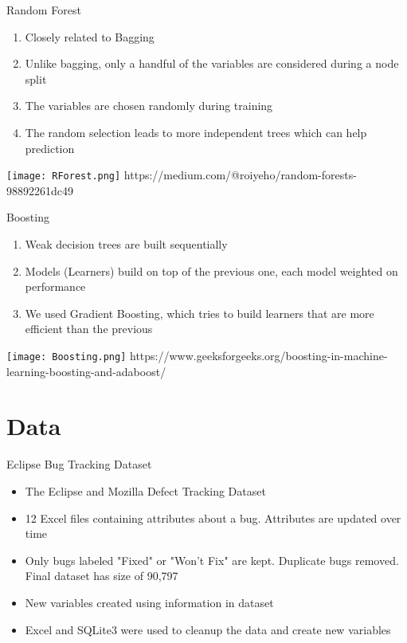 \documentclass[notes,compress,serif,professionalfont]{beamer}
\begin{document}
\begin{frame}{Random Forest}
    \begin{enumerate}[<+->]
        \item Closely related to Bagging
        \item Unlike bagging, only a handful of the variables are considered during a node split
        \item The variables are chosen randomly during training
        \item The random selection leads to more independent trees which can help prediction
    \end{enumerate}
        \centering
    \texttt{[image: RForest.png]}
    \tiny{https://medium.com/@roiyeho/random-forests-98892261dc49}
\end{frame}

\begin{frame}{Boosting}
    \begin{enumerate}[<+->]
        \item Weak decision trees are built sequentially
        \item Models (Learners) build on top of the previous one, each model weighted on performance
        \item We used Gradient Boosting, which tries to build learners that are more efficient than the previous
    \end{enumerate}
    \centering
    \texttt{[image: Boosting.png]}
    \tiny{https://www.geeksforgeeks.org/boosting-in-machine-learning-boosting-and-adaboost/}
\end{frame}

\section{Data}
\begin{frame}{Eclipse Bug Tracking Dataset}
    \begin{itemize}
        \item <1- > The Eclipse and Mozilla Defect Tracking Dataset
        \item <2- > 12 Excel files containing attributes about a bug. Attributes are updated over time
        \item <3- > Only bugs labeled "Fixed" or "Won't Fix" are kept. Duplicate bugs removed. Final dataset has size of 90,797
        \item <4- > New variables created using information in dataset
        \item <5- > Excel and SQLite3 were used to cleanup the data and create new variables
    \end{itemize}
\end{frame}
\end{document}
